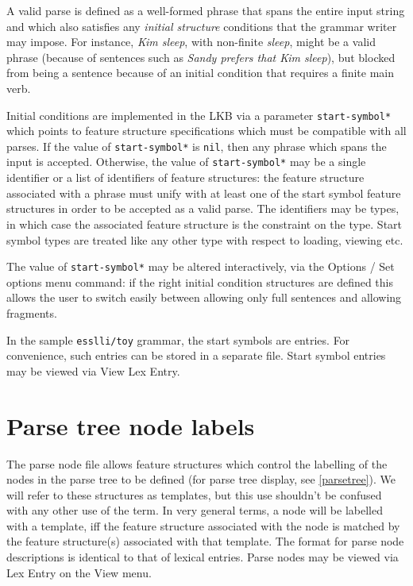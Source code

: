\documentclass[12pt]{report}
\newcommand{\filename}[1]{{\tt #1}}
\newcommand{\lkbparam}[1]{{\tt #1}}
\newcommand{\lkbmenucommand}{{\bf}}
\newcommand{\newterm}[1]{{\it #1}}
\begin{document}
A valid parse is defined as a well-formed phrase that spans the entire
input string and which also satisfies any \newterm{initial structure} 
conditions
that the grammar writer may impose.  For instance,  {\it Kim sleep},
with non-finite {\it sleep},
might be a valid phrase (because
of sentences such as {\it Sandy prefers that Kim sleep}), but blocked
from being a sentence because of an initial condition that requires a finite
main verb.  

Initial conditions are implemented in the LKB via a
parameter \lkbparam{*start-symbol*} 
which points to feature structure specifications
which must be compatible with all parses.  If the value of 
\lkbparam{*start-symbol*}
is {\tt nil}, then any phrase which spans the input is accepted.
Otherwise,
the value of \lkbparam{*start-symbol*}
may be a single identifier or a list of identifiers of feature
structures: the feature structure associated with a phrase must unify
with at least one of the start symbol feature structures in order
to be accepted as a valid parse.  The identifiers may be types, in which
case the associated feature structure is the constraint on the
type.  Start symbol 
types are treated like any other type with respect to loading,
viewing etc.
 
The value of \lkbparam{*start-symbol*} may be altered interactively,
via the {\lkbmenucommand Options} / {\lkbmenucommand Set options} 
menu command: if the right initial condition structures are defined
this allows the user to switch easily between 
allowing only full sentences and allowing fragments.

In the sample \filename{esslli/toy} grammar, the start symbols are 
entries.  For convenience, such entries
can be stored in a separate file.
Start symbol entries may be viewed via {\lkbmenucommand View} 
{\lkbmenucommand Lex Entry}.

\section{Parse tree node labels}
\label{treenodes}

The parse node file allows feature structures which control the
labelling of the nodes in the
parse tree to be defined (for parse tree display, see \ref{parsetree}).
We will refer to these structures as templates, but this use 
shouldn't be confused with any other use of the term.
In very general terms,
a node will be labelled with a template, iff the feature
structure associated with the node is matched by the feature
structure(s) associated with that template.
The format for parse node descriptions is
identical to that of lexical entries.  Parse nodes may be viewed via 
{\lkbmenucommand Lex Entry} on the {\lkbmenucommand View} menu.
\end{document}
